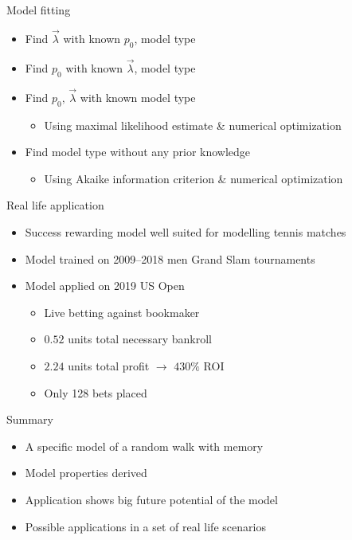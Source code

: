 \documentclass[american]{beamer}
\begin{document}
    \begin{frame}{Model fitting}
        \begin{itemize}
            \item Find $\overrightarrow{\lambda}$ with known $p_{0}$, model type
            \item Find $p_{0}$ with known $\overrightarrow{\lambda}$, model type
            \item Find $p_{0},\,\overrightarrow{\lambda}$ with known model type
            \begin{itemize}
                \item Using maximal likelihood estimate \& numerical optimization
            \end{itemize}
            \item Find model type without any prior knowledge
            \begin{itemize}
                \item Using Akaike information criterion \& numerical optimization
            \end{itemize}
        \end{itemize}
    \end{frame}

    \begin{frame}{Real life application}
        \begin{itemize}
            \item Success rewarding model well suited for modelling tennis matches
            \item Model trained on 2009--2018 men Grand Slam tournaments
            \item Model applied on 2019 US Open
            \begin{itemize}
                \item Live betting against bookmaker
                \item $0.52$ units total necessary bankroll
                \item $2.24$ units total profit $\rightarrow$ $430\%$ ROI
                \item Only 128 bets placed
            \end{itemize}
        \end{itemize}
    \end{frame}

    \begin{frame}{Summary}
        \begin{itemize}
            \item A specific model of a random walk with memory
            \item Model properties derived
            \item Application shows big future potential of the model
            \item Possible applications in a set of real life scenarios
        \end{itemize}
    \end{frame}
\end{document}

